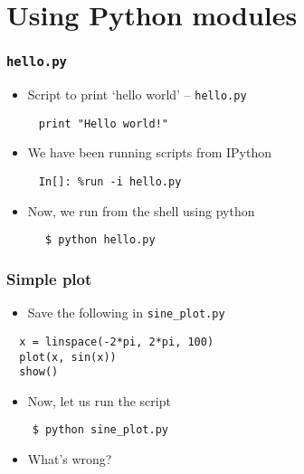 \section{Using Python modules}

\begin{frame}[fragile]
  \frametitle{\texttt{hello.py}}
    \begin{itemize}
    \item Script to print `hello world' -- \texttt{hello.py}
    \end{itemize}
    \begin{lstlisting}
     print "Hello world!"
    \end{lstlisting}
    \begin{itemize}
    \item We have been running scripts from IPython
    \end{itemize}
    \begin{lstlisting}
     In[]: %run -i hello.py
    \end{lstlisting}
    \begin{itemize}
    \item Now, we run from the shell using python
    \end{itemize}
    \begin{lstlisting}
      $ python hello.py
    \end{lstlisting} %
\end{frame}

\begin{frame}[fragile]
  \frametitle{Simple plot}
  \begin{itemize}
  \item Save the following in \texttt{sine\_plot.py} 
  \end{itemize}
  \begin{lstlisting}
  x = linspace(-2*pi, 2*pi, 100)
  plot(x, sin(x))
  show()
  \end{lstlisting}
  \begin{itemize}
  \item Now, let us run the script
  \end{itemize}
  \begin{lstlisting}
    $ python sine_plot.py
  \end{lstlisting} %
  \begin{itemize}
  \item What's wrong?
  \end{itemize}
\end{frame}


